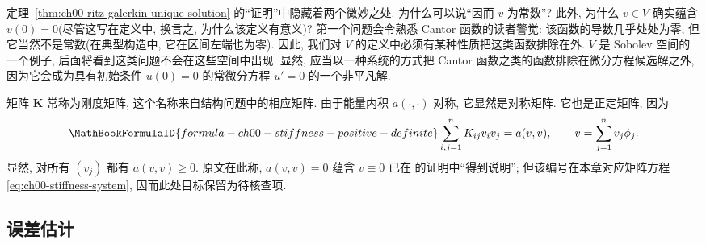 \setcounter{thmcount}{3}
\begin{Remark}
\label{rem:ch00-hidden-sobolev-points}
定理~\ref{thm:ch00-ritz-galerkin-unique-solution} 的``证明''中隐藏着两个微妙之处. 为什么可以说``因而 $v$ 为常数''? 此外, 为什么 $v\in V$ 确实蕴含 $v(0)=0$(尽管这写在定义中, 换言之, 为什么该定义有意义)? 第一个问题会令熟悉 Cantor 函数的读者警觉: 该函数的导数几乎处处为零, 但它当然不是常数(在典型构造中, 它在区间左端也为零). 因此, 我们对 $V$ 的定义中必须有某种性质把这类函数排除在外. $V$ 是 Sobolev 空间的一个例子, 后面将看到这类问题不会在这些空间中出现. 显然, 应当以一种系统的方式把 Cantor 函数之类的函数排除在微分方程候选解之外, 因为它会成为具有初始条件 $u(0)=0$ 的常微分方程 $u'=0$ 的一个非平凡解.
\end{Remark}

\setcounter{thmcount}{4}
\begin{Remark}
\label{rem:ch00-stiffness-matrix}
矩阵 $\mathbf K$ 常称为刚度矩阵, 这个名称来自结构问题中的相应矩阵. 由于能量内积 $a(\cdot,\cdot)$ 对称, 它显然是对称矩阵. 它也是正定矩阵, 因为
\[
\MathBookFormulaID{formula-ch00-stiffness-positive-definite}
\sum_{i,j=1}^nK_{ij}v_iv_j=a(v,v),
\qquad v=\sum_{j=1}^nv_j\phi_j.
\]
显然, 对所有 $(v_j)$ 都有 $a(v,v)\geq0$. 原文在此称, $a(v,v)=0$ 蕴含 $v\equiv0$ 已在  的证明中``得到说明''; 但该编号在本章对应矩阵方程 \eqref{eq:ch00-stiffness-system}, 因而此处目标保留为待核查项.
\end{Remark}

\subsection{误差估计}
\label{sec:ch00-error-estimates}

